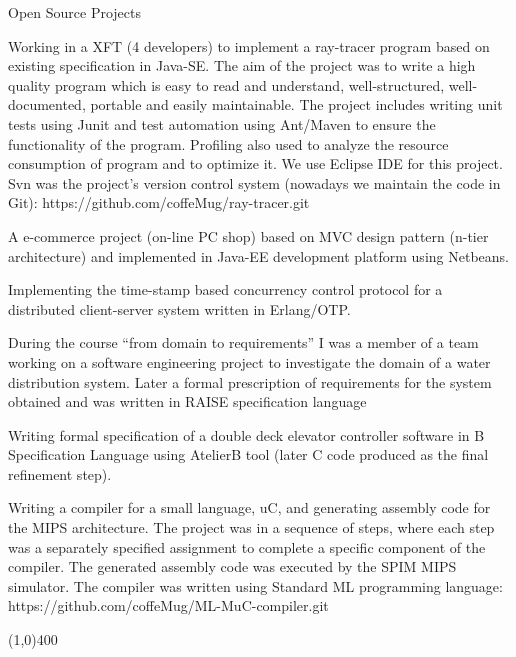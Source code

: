 \documentclass{resume}
\begin{document}
\begin{category}{Open Source Projects}

\citembullet
Working in a XFT (4 developers) to implement a ray-tracer program based on existing specification in Java-SE.
The aim of the project was to write a high quality program which is easy to read and understand, 
well-structured, well-documented, portable and easily maintainable.   
The project includes writing unit tests using Junit and test automation using Ant/Maven to ensure the functionality of the program.
Profiling also used to analyze the resource consumption of program and to optimize it. 
We use Eclipse IDE for this project.
Svn was the project's version control system (nowadays we maintain the code in Git):
https://github.com/coffeMug/ray-tracer.git

\citembullet A e-commerce project (on-line PC shop) based on MVC design pattern (n-tier architecture) and 
implemented in Java-EE development platform using Netbeans.

\citembullet
Implementing the time-stamp based concurrency control protocol for a distributed client-server system written in
Erlang/OTP.

\citembullet
During the course ``from domain to requirements'' I was a member of a team working on a software engineering
project to investigate the domain of a water distribution system. Later a formal prescription of 
requirements for the system obtained and was written in RAISE specification language

\citembullet
Writing formal specification of a double deck elevator controller software in B Specification Language using
AtelierB tool (later C code produced as the final refinement step).

\citembullet Writing a compiler for a small language, uC, and generating assembly 
code for the MIPS architecture.
The project was in a sequence of steps, where each step was a separately specified 
assignment to complete a specific component of the compiler.
The generated assembly code was executed by the SPIM MIPS simulator. 
The compiler was written using Standard ML programming language:
https://github.com/coffeMug/ML-MuC-compiler.git 

\end{category}

\begin{center}
\line(1,0){400}
\end{center}

\end{document}
